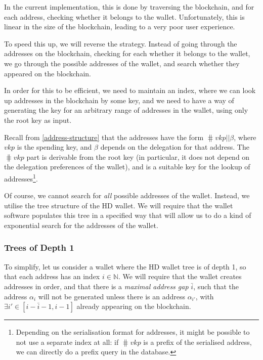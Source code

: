 \documentclass[11pt,a4paper]{article}
\begin{document}
In the current implementation, this is done by traversing the
blockchain, and for each address, checking whether it belongs to the
wallet. Unfortunately, this is linear in the size of the blockchain,
leading to a very poor user experience.

To speed this up, we will reverse the strategy. Instead of going through
the addresses on the blockchain, checking for each whether it belongs to
the wallet, we go through the possible addresses of the wallet, and
search whether they appeared on the blockchain.

In order for this to be efficient, we need to maintain an index, where
we can look up addresses in the blockchain by some key, and we need to
have a way of generating the key for an arbitrary range of addresses in
the wallet, using only the root key as input.

Recall from \cref{address-structure} that the addresses have the form
\(\hash{vkp} \mathbin{||} \beta\), where \(vkp\) is the spending key, and
\(\beta\) depends on the delegation for that address. The
\(\hash{vkp}\) part is derivable from the root key (in
particular, it does not depend on the delegation preferences of the
wallet), and is a suitable key for the lookup of addresses\footnote{Depending
  on the serialisation format for addresses, it might be possible to not
  use a separate index at all: if \(\hash{vkp}\) is a prefix of
  the serialised address, we can directly do a prefix query in the
  database.}.

Of course, we cannot search for \emph{all} possible addresses of the
wallet. Instead, we utilise the tree structure of the HD wallet. We will
require that the wallet software populates this tree in a specified way
that will allow us to do a kind of exponential search for the addresses
of the wallet.

\subsubsection{Trees of Depth 1}
\label{trees-of-depth-1}

To simplify, let us consider a wallet where the HD wallet tree is of
depth 1, so that each address has an index \(i \in \mathbb{N}\). We will
require that the wallet creates addresses in order, and that there is a
\emph{maximal address gap} \(\bar{i}\), such that the address
\(\alpha_i\) will not be generated unless there is an address
\(\alpha_{i'}\), with \(\exists i' \in [i-\bar{i}-1, i-1]\) already
appearing on the blockchain.
\end{document}
